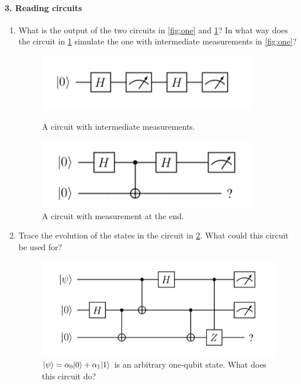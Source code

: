 \paragraph*{3. Reading circuits}
\begin{enumerate}
  \item What is the output of the two circuits in \cref{fig:one} and \cref{fig:two}?
  In what way does the circuit in \cref{fig:two} simulate the one with intermediate measurements in \cref{fig:one}?
\begin{figure}
    \centering
    \begin{minipage}{0.45\textwidth}
        \centering
        \includegraphics[width=0.9\textwidth]{inter_measure.png} %
        \caption{A circuit with intermediate measurements.}
        \label{fig:one}
    \end{minipage}\hfill
    \begin{minipage}{0.45\textwidth}
        \centering
        \includegraphics[width=0.9\textwidth]{deferred_measure.png} %
        \caption{A circuit with measurement at the end.}
        \label{fig:two}
    \end{minipage}
\end{figure}
  \item Trace the evolution of the states in the circuit in \cref{fig:tele}.  What could this circuit be used for?
\begin{figure}[htb]
\centering
\includegraphics[width=.5\textwidth]{tele_circuit.png}
\caption{$|\psi\rangle = \alpha_0 |0\rangle + \alpha_1 |1\rangle$ is an arbitrary one-qubit state.  What does this circuit do?}
\label{fig:tele}
\end{figure}
\end{enumerate}

